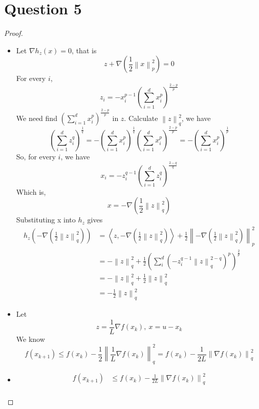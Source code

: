 \documentclass{article}
\begin{document}
\section*{Question 5}
    \begin{proof}
        \begin{itemize}
            \item Let $\nabla h_z(x)=0$, that is
            $$ z+\nabla\left(\frac{1}{2}\left\lVert x \right \rVert_p^2\right)=0$$
            For every $i$,
            $$z_i = -x_i^{p-1}\left(\sum_{i=1}^d x_i^p\right)^{\frac{2-p}{p}}$$
            We need find $\left(\sum_{i=1}^d x_i^p\right)^{\frac{2-p}{p}}$ in $z$.
            Calculate $\left\lVert z \right \rVert_q^2$, we have
            $$\left(\sum_{i=1}^d z_i^q\right)^{\frac{1}{q}}=-\left(\sum_{i=1}^d x_i^{p}\right)^{\frac{1}{q}}\left(\sum_{i=1}^d x_i^p\right)^{\frac{2-p}{p}}=-\left(\sum_{i=1}^d x_i^p\right)^{\frac{1}{p}}$$
            So, for every $i$, we have
            $$x_i=-z_i^{q-1}\left(\sum_{i=1}^d z_i^q\right)^{\frac{2-q}{q}}$$
            Which is, $$x=-\nabla\left(\frac{1}{2}\left\lVert z \right \rVert_q^2\right)$$
            Substituting x into $h_z$ gives
            \begin{align*}
                h_z\left(-\nabla\left(\frac{1}{2}\left\lVert z \right \rVert_q^2\right)\right)
                &=\left\langle z,-\nabla\left(\frac{1}{2}\left\lVert z \right \rVert_q^2\right) \right\rangle+\frac{1}{2}\left\lVert -\nabla\left(\frac{1}{2}\left\lVert z \right \rVert_q^2\right) \right \rVert_p^2\\
                &=-\left\lVert z \right \rVert_q^2+\frac{1}{2}\left(\sum_{i}^d\left(-z_i^{q-1}\left\lVert z \right \rVert_q^{2-q}\right)^p\right)^{\frac{2}{p}}\\
                &=-\left\lVert z \right \rVert_q^2+\frac{1}{2}\left\lVert z \right \rVert_q^2\\
                &=-\frac{1}{2}\left\lVert z \right \rVert_q^2
            \end{align*}
            \item Let $$z=\frac{1}{L}\nabla f(x_k),\ x=u-x_k$$
                We know $$f(x_{k+1})\leqslant f(x_k)-\frac{1}{2}\left\lVert \frac{1}{L}\nabla f(x_k) \right \rVert_q^2=f(x_k)-\frac{1}{2L}\left\lVert \nabla f(x_k) \right \rVert_q^2$$
            \item \begin{align*}
                f(x_{k+1}) &\leqslant f(x_k)-\frac{1}{2L}
                    \left\lVert \nabla f(x_k) \right \rVert_q^2\\

\end{align*}
\end{itemize}
\end{proof}
\end{document}

